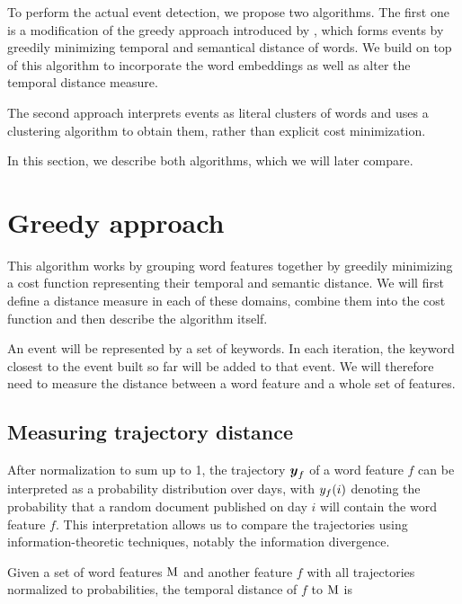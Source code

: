 
To perform the actual event detection, we propose two algorithms. The first one is a modification of the greedy approach introduced by \cite{event-detection}, which forms events by greedily minimizing temporal and semantical distance of words. We build on top of this algorithm to incorporate the word embeddings as well as alter the temporal distance measure.

The second approach interprets events as literal clusters of words and uses a clustering algorithm to obtain them, rather than explicit cost minimization.

In this section, we describe both algorithms, which we will later compare.


\section{Greedy approach}
This algorithm works by grouping word features together by greedily minimizing a cost function representing their temporal and semantic distance. We will first define a distance measure in each of these domains, combine them into the cost function and then describe the algorithm itself.

An event will be represented by a set of keywords. In each iteration, the keyword closest to the event built so far will be added to that event. We will therefore need to measure the distance between a word feature and a whole set of features.

\subsection{Measuring trajectory distance}
After normalization to sum up to 1, the trajectory $\vect{\traj}_{f}$ of a word feature $f$ can be interpreted as a probability distribution over days, with $y_{f}(i)$ denoting the probability that a random document published on day $i$ will contain the word feature $f$. This interpretation allows us to compare the trajectories using information-theoretic techniques, notably the information divergence.

Given a set of word features $\text{M}$ and another feature $f$ with all trajectories normalized to probabilities, the temporal distance of $f$ to $\text{M}$ is

